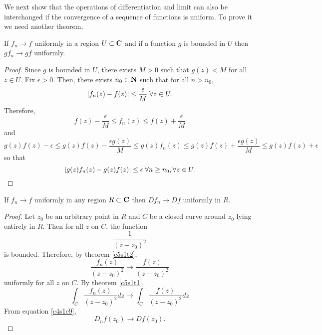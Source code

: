 We next show that the operations of differentiation and limit can also be
interchanged if the convergence of a sequence of functions is uniform. To 
prove it we need another theorem,
\begin{thm}\label{c5s1t2}
If $f_n \rightarrow f$ uniformly in a region $U \subset \mathbf{C}$ and if a function 
$g$ is bounded in $U$ then $gf_n \rightarrow gf$ uniformly.
\end{thm}
\begin{proof}
Since $g$ is bounded in $U$, there exists $M > 0$ such that $g(z) < M$ for all
$z \in U$. Fix $\epsilon > 0$. Then, there exists $n_0 \in \mathbf{N}$ such that
for all $n > n_0$,
\[
\left\vert{f_n(z) - f(z)}\right\vert \le \frac{\epsilon}{M} \;\forall z \in U.
\]
Therefore,
\[
f(z) - \frac{\epsilon}{M} \le f_n(z) \le f(z) + \frac{\epsilon}{M}
\]
and 
\[
g(z)f(z) - \epsilon \le g(z)f(z) - \frac{\epsilon g(z)}{M} \le g(z)f_n(z) \le
g(z)f(z) + \frac{\epsilon g(z)}{M} \le g(z)f(z) + \epsilon
\]
so that
\[
\left\vert{g(z)f_n(z) - g(z)f(z)}\right\vert \le \epsilon \;\forall n \ge n_0, \forall z \in U.
\]
\end{proof}

\begin{thm}[Weierstrass]\label{c5s1t3}
If $f_n \rightarrow f$ uniformly in any region $R \subset \mathbf{C}$ then $Df_n 
\rightarrow Df$ uniformly in $R$.
\end{thm}
\begin{proof}
Let $z_0$ be an arbitrary point in $R$ and $C$ be a closed curve around
$z_0$ lying entirely in $R$. Then for all $z$ on $C$, the function
\[
\frac{1}{(z - z_0)^2}
\]
is bounded. Therefore, by theorem \ref{c5s1t2},
\[
\frac{f_n(z)}{(z - z_0)^2} \rightarrow \frac{f(z)}{(z - z_0)^2}
\]
uniformly for all $z$ on $C$. By theorem \ref{c5s1t1},
\[
\int_C \frac{f_n(z)}{(z - z_0)^2} dz \rightarrow 
\int_C \frac{f(z)}{(z - z_0)^2} dz
\]
From equation \eqref{c4s1e9},
\[
D_n f(z_0) \rightarrow Df(z_0).
\]
\end{proof}

